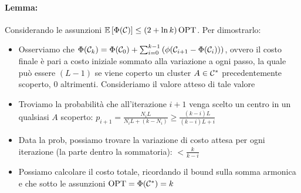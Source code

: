 \paragraph{Lemma:} Considerando le assunzioni $\mathbb{E}\left[\Phi(\mathcal{C})\right] \leq \left(2 + \ln k\right) \textnormal{OPT} $. Per dimostrarlo:
\begin{itemize}
	\item Osserviamo che $\Phi (\mathcal{C}_k) = \Phi (\mathcal{C}_0) + \sum_{i = 0}^{k-1} \left(\phi(\mathcal{C}_{i+1} - \Phi (\mathcal{C}_i))\right)$, ovvero il costo finale è pari a costo iniziale sommato alla variazione a ogni passo, la quale può essere $(L-1)$ se viene coperto un cluster $A \in \mathcal{C}^\ast$ precedentemente scoperto, $0$ altrimenti. Consideriamo il valore atteso di tale valore
	
	\item Troviamo la probabilità che all'iterazione $i+1$ venga scelto un centro in un qualsiasi $A$ scoperto: $p_{i+1} = \frac{N_i L}{N_i L + (k- N_i)} \geq \frac{(k-i) L}{(k-i)L + i}$
	
	\item Data la prob, possiamo trovare la variazione di costo attesa per ogni iterazione (la parte dentro la sommatoria): $< \frac{k}{k-i}$
	
	\item Possiamo calcolare il costo totale, ricordando il bound sulla somma armonica e che sotto le assunzioni $\textnormal{OPT} = \Phi (\mathcal{C}^\ast) = k$
\end{itemize}